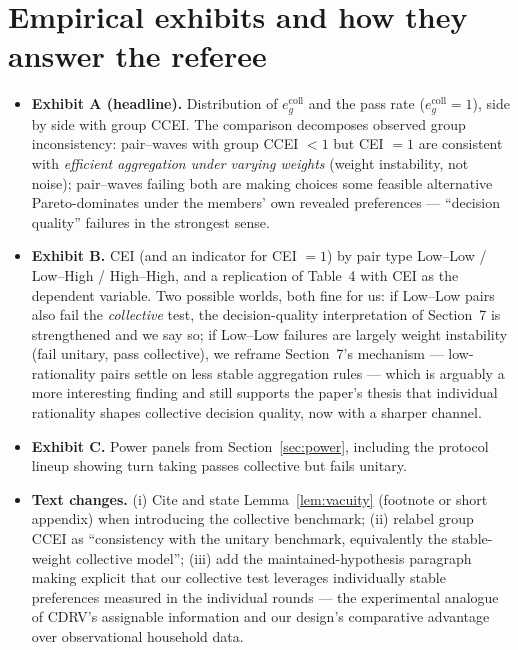 \documentclass[11pt]{article}
\theoremstyle{remark}
\begin{document}
\section{Empirical exhibits and how they answer the referee}\label{sec:exhibits}

\begin{itemize}[leftmargin=1.6em]
\item \textbf{Exhibit A (headline).} Distribution of $e^{\mathrm{coll}}_g$ and the pass rate ($e^{\mathrm{coll}}_g=1$), side by side with group CCEI. The comparison decomposes observed group inconsistency: pair--waves with group CCEI $<1$ but CEI $=1$ are consistent with \emph{efficient aggregation under varying weights} (weight instability, not noise); pair--waves failing both are making choices some feasible alternative Pareto-dominates under the members' own revealed preferences --- ``decision quality'' failures in the strongest sense.
\item \textbf{Exhibit B.} CEI (and an indicator for CEI $=1$) by pair type Low--Low / Low--High / High--High, and a replication of Table~4 with CEI as the dependent variable. Two possible worlds, both fine for us: if Low--Low pairs also fail the \emph{collective} test, the decision-quality interpretation of Section~7 is strengthened and we say so; if Low--Low failures are largely weight instability (fail unitary, pass collective), we reframe Section~7's mechanism --- low-rationality pairs settle on less stable aggregation rules --- which is arguably a more interesting finding and still supports the paper's thesis that individual rationality shapes collective decision quality, now with a sharper channel.
\item \textbf{Exhibit C.} Power panels from Section~\ref{sec:power}, including the protocol lineup showing turn taking passes collective but fails unitary.
\item \textbf{Text changes.} (i) Cite \citet[Prop.~3]{cherchye2007} and state Lemma~\ref{lem:vacuity} (footnote or short appendix) when introducing the collective benchmark; (ii) relabel group CCEI as ``consistency with the unitary benchmark, equivalently the stable-weight collective model''; (iii) add the maintained-hypothesis paragraph making explicit that our collective test leverages individually stable preferences measured in the individual rounds --- the experimental analogue of CDRV's assignable information and our design's comparative advantage over observational household data.
\end{itemize}
\end{document}

